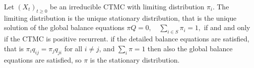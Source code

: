  Let $(X_t)_{t \ge 0}$ be an irreducible CTMC with limiting distribution $\pi_i$. The limiting distribution is the unique stationary distribution, that is the unique solution of the global balance equations 
$\pi Q = 0, \quad \sum_{i \in S} \pi_i = 1,$ 
if and  and only if the CTMC is positive recurrent.
 if the detailed balance equations are satisfied, that is 
$\pi_i q_{ij} = \pi_{j}q_{ji}$ for all $i \ne j$, and $\sum_i \pi = 1$ then also the global balance equations are satisfied, so $\pi$ is the stationary distribution.